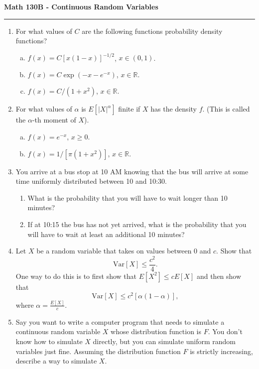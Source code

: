 \documentclass[11pt,letterpaper]{report}
\newcommand{\reals}{\mathbb{R}}
\newcommand{\Var}{\text{Var}}
\begin{document}
\begin{center}
{\bf \Large Math 130B - Continuous Random Variables}
\vspace{0.2cm}
\hrule
\end{center}

\begin{enumerate}
	\item For what values of $C$ are the following functions probability density functions?
	\begin{enumerate}[(a)]
		\item $f(x) = C[x(1-x)]^{-1/2}$, $x\in (0, 1)$.
		\item $f(x) = C\exp(-x-e^{-x})$, $x\in \reals$.
		\item $f(x) = C/(1+x^2)$, $x\in \reals$.
	\end{enumerate}

	\item For what values of $\alpha$ is $E[|X|^{\alpha}]$ finite if $X$ has the density $f$. (This is called the $\alpha$-th moment of $X$).
	\begin{enumerate}[(a)]
		\item $f(x) = e^{-x}$, $x\geq 0$.
		\item $f(x) = 1/[\pi(1+x^2)]$, $x\in \reals$.
	\end{enumerate}

	\item You arrive at a bus stop at 10 AM knowing that the bus will arrive at some time uniformly distributed between 10 and 10:30.
	\begin{enumerate}
		\item What is the probability that you will have to wait longer than 10 minutes?
		\item If at 10:15 the bus has not yet arrived, what is the probability that you will have to wait at least an additional 10 minutes?
	\end{enumerate}

	\item Let $X$ be a random variable that takes on values between 0 and $c$. Show that
	\[
	\Var[X] \leq \frac{c^2}{4}.
	\]
	One way to do this is to first show that $E[X^2]\leq cE[X]$ and then show that
	\[
	\Var[X] \leq c^2[\alpha(1-\alpha)],
	\]
	where $\alpha = \frac{E[X]}{c}$.

	\item Say you want to write a computer program that needs to simulate a continuous random variable $X$ whose distribution function is $F$. You don't know how to simulate $X$ directly, but you can simulate uniform random variables just fine. Assuming the distribution function $F$ is strictly increasing, describe a way to simulate $X$.


\end{enumerate}
\end{document}
